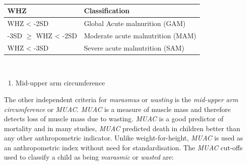 \documentclass[12pt,]{book}
\providecommand{\tightlist}{%
  \setlength{\itemsep}{0pt}\setlength{\parskip}{0pt}}
\theoremstyle{definition}
\theoremstyle{definition}
\theoremstyle{definition}
\theoremstyle{remark}
\begin{document}
~

\begin{longtable}[]{@{}ll@{}}
\toprule
\begin{minipage}[b]{0.34\columnwidth}\raggedright
\textbf{WHZ}\strut
\end{minipage} & \begin{minipage}[b]{0.47\columnwidth}\raggedright
\textbf{Classification}\strut
\end{minipage}\tabularnewline
\midrule
\endhead
\begin{minipage}[t]{0.34\columnwidth}\raggedright
WHZ \textless{} -2SD\strut
\end{minipage} & \begin{minipage}[t]{0.47\columnwidth}\raggedright
Global Acute malnurition (GAM)\strut
\end{minipage}\tabularnewline
\begin{minipage}[t]{0.34\columnwidth}\raggedright
-3SD \(\geq\) WHZ \textless{} -2SD\strut
\end{minipage} & \begin{minipage}[t]{0.47\columnwidth}\raggedright
Moderate acute malnutrition (MAM)\strut
\end{minipage}\tabularnewline
\begin{minipage}[t]{0.34\columnwidth}\raggedright
WHZ \textless{} -3SD\strut
\end{minipage} & \begin{minipage}[t]{0.47\columnwidth}\raggedright
Severe acute malnutrition (SAM)\strut
\end{minipage}\tabularnewline
\bottomrule
\end{longtable}

~

\begin{enumerate}
\def\labelenumi{\arabic{enumi}.}
\setcounter{enumi}{1}
\tightlist
\item
  Mid-upper arm circumference
\end{enumerate}

The other independent criteria for \emph{marasmus} or \emph{wasting} is
the \emph{mid-upper arm circumference} or \emph{MUAC}. \emph{MUAC} is a
measure of muscle mass and therefore detects loss of muscle mass due to
wasting. \emph{MUAC} is a good predictor of mortality and in many
studies, \emph{MUAC} predicted death in children better than any other
anthropometric indicator. Unlike weight-for-height, \emph{MUAC} is used
as an anthropometric index without need for standardisation. The
\emph{MUAC} cut-offs used to classify a child as being \emph{marasmic}
or \emph{wasted} are:
\end{document}
